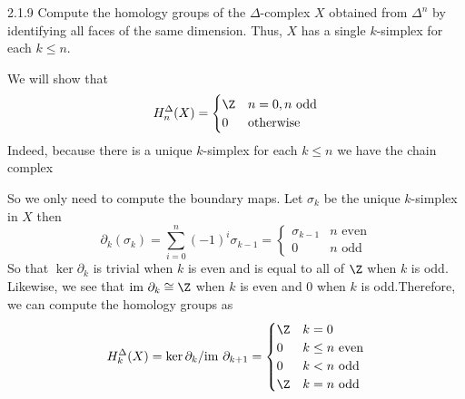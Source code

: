 \documentclass{article}
\newcommand{\im}{\text{im }}
\begin{document}
\begin{exercise}{2.1.9}{\parindent}
  Compute the homology groups of the $\Delta$-complex $X$ obtained
  from $\Delta^n$ by identifying all faces of the same
  dimension. Thus, $X$ has a single $k$-simplex for each $k \leq n$.
\end{exercise}
\begin{solution}{\parindent}
  We will show that
  \[
  H_n^{\Delta}(X) =
  \begin{cases}
    \Z & n=0, n\text{ odd} \\
    0 & \text{otherwise}
  \end{cases}
  \]
  Indeed, because there is a unique $k$-simplex for each $k \leq n$ we
  have the chain complex
  \begin{center}
  \end{center}
  So we only need to compute the boundary maps. Let $\sigma_k$ be the
  unique $k$-simplex in $X$ then
  \[
  \partial_k(\sigma_k) = \sum_{i=0}^{n}(-1)^i\sigma_{k-1} =
  \begin{cases}
    \sigma_{k-1} & n \text{ even} \\
    0 & n \text{ odd}
  \end{cases}
  \]
  So that $\ker \partial_k$ is trivial when $k$ is even and is equal
  to all of $\Z$ when $k$ is odd. Likewise, we see that
  $\im \partial_k \cong \Z$ when $k$ is even and $0$ when $k$ is
  odd.Therefore, we can compute the homology groups as
  \[
  H_k^{\Delta}(X) = \ker \partial_k/\im \partial_{k+1} =
  \begin{cases}
    \Z & k = 0 \\
    0 & k \leq n \text{ even} \\
    0 & k < n \text{ odd} \\
    \Z & k = n \text{ odd}
  \end{cases}
  \]
\end{solution}
\end{document}
